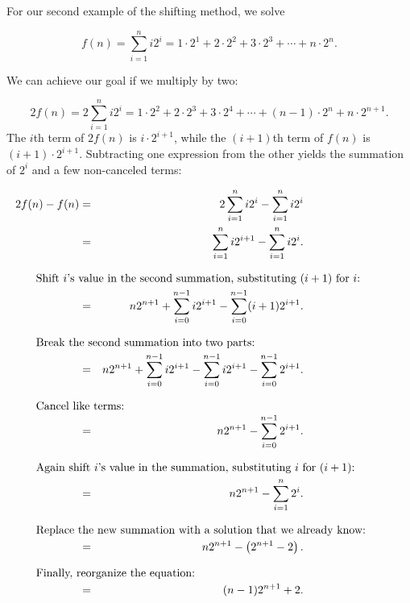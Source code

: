 \begin{example}
For our second example of the shifting method, we solve

\vspace{-\medskipamount}
\[f(n) = \sum_{i=1}^{n} i2^i = 1 \cdot 2^1 + 2 \cdot 2^2 + 3 \cdot
2^3 + \cdots + n \cdot 2^n.\]

\vspace{-\medskipamount}
\noindent We can achieve our goal if we multiply by two:

\vspace{-\bigskipamount}

\[2f(n) = 2\sum_{i=1}^{n} i2^i = 1 \cdot 2^2 + 2 \cdot 2^3 + 3 \cdot
2^4 + \cdots + (n-1) \cdot 2^n + n \cdot 2^{n+1}.\]
\noindent The \(i\)th term of \(2f(n)\) is \(i \cdot 2^{i+1}\),
while the \((i+1)\)th term of \(f(n)\) is \mbox{\((i+1) \cdot 2^{i+1}\)}.
Subtracting one expression from the other yields the summation of
\(2^i\) and a few non-canceled terms:

\vspace{-\bigskipamount}
\vspace{-\medskipamount}
\vspace{-\medskipamount}
\begin{eqnarray*}
2f(n) - f(n) & = & 2\sum_{i=1}^n i 2^i - \sum_{i=1}^n i 2^i\\
             & = & \sum_{i=1}^n i 2^{i+1} - \sum_{i=1}^n i 2^i.\\
\noalign{\hspace{\parskip}
\hbox{\rule{0in}{1.3pc}Shift \(i\)'s value in the second summation,
substituting \((i+1)\) for \(i\):}}
             & = & n2^{n+1} + \sum_{i=0}^{n-1}i2^{i+1} -
                              \sum_{i=0}^{n-1}(i+1)2^{i+1}.\\
\noalign{\hspace{\parskip}
\hbox{\rule{0in}{1.3pc}Break the second summation into two parts:}}
             & = & n2^{n+1} + \sum_{i=0}^{n-1}i2^{i+1} -
                              \sum_{i=0}^{n-1}i2^{i+1} -
                              \sum_{i=0}^{n-1}2^{i+1}.\\
\noalign{\hspace{\parskip}
\hbox{\rule{0in}{1.3pc}Cancel like terms:}}
             & = & n2^{n+1} - \sum_{i=0}^{n-1} 2^{i+1}.\\
\noalign{\hspace{\parskip}
\hbox{\rule{0in}{1.3pc}Again shift \(i\)'s value in the
summation, substituting \(i\) for \((i+1)\):}}
             & = & n2^{n+1} - \sum_{i=1}^{n} 2^i.\\
\noalign{\hspace{\parskip}
\hbox{\rule{0in}{1.3pc}Replace the new summation with a
solution that we already know:}}
             & = & n2^{n+1} - \left ( 2^{n+1} - 2 \right ).\\
\noalign{\hspace{\parskip}
\hbox{\rule{0in}{1.3pc}Finally, reorganize the equation:}}
             & = & (n-1)2^{n+1} + 2.
\end{eqnarray*}
\end{example}

